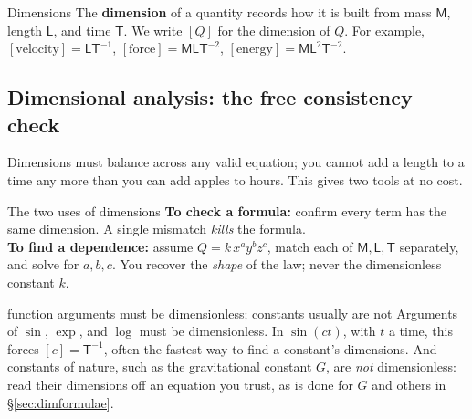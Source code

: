\begin{defbox}{Dimensions}
The \textbf{dimension} of a quantity records how it is built from mass $\mathsf{M}$, length
$\mathsf{L}$, and time $\mathsf{T}$. We write $[Q]$ for the dimension of $Q$. For example,
$[\text{velocity}]=\mathsf{L}\mathsf{T}^{-1}$, $[\text{force}]=\mathsf{M}\mathsf{L}\mathsf{T}^{-2}$,
$[\text{energy}]=\mathsf{M}\mathsf{L}^2\mathsf{T}^{-2}$.
\end{defbox}

\subsection{Dimensional analysis: the free consistency check}

Dimensions must balance across any valid equation; you cannot add a length to a time any more than
you can add apples to hours. This gives two tools at no cost.

\begin{methodbox}{The two uses of dimensions}
\textbf{To check a formula:} confirm every term has the same dimension. A single mismatch \emph{kills}
the formula. \\[3pt]
\textbf{To find a dependence:} assume $Q=k\,x^a y^b z^c$, match each of $\mathsf{M},\mathsf{L},\mathsf{T}$
separately, and solve for $a,b,c$. You recover the \emph{shape} of the law; never the dimensionless
constant $k$.
\end{methodbox}

\begin{trapbox}{function arguments must be dimensionless; constants usually are not}
Arguments of $\sin$, $\exp$, and $\log$ must be dimensionless. In $\sin(ct)$, with $t$ a time, this forces
$[c]=\mathsf{T}^{-1}$, often the fastest way to find a constant's dimensions. And constants of nature, such as
the gravitational constant $G$, are \emph{not} dimensionless: read their dimensions off an equation you
trust, as is done for $G$ and others in \S\ref{sec:dimformulae}.
\end{trapbox}

